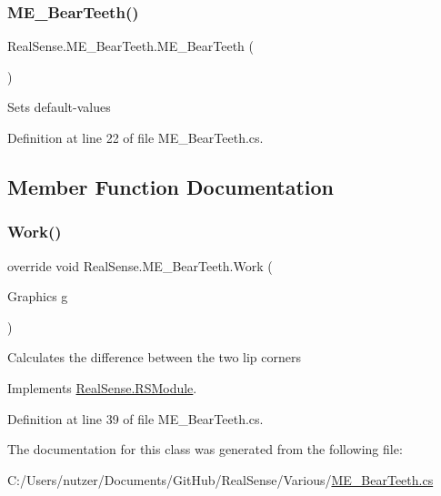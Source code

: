 \subsubsection{\texorpdfstring{M\+E\+\_\+\+Bear\+Teeth()}{ME\_BearTeeth()}}
{\footnotesize\ttfamily Real\+Sense.\+M\+E\+\_\+\+Bear\+Teeth.\+M\+E\+\_\+\+Bear\+Teeth (\begin{DoxyParamCaption}{ }\end{DoxyParamCaption})}

Sets default-\/values 

Definition at line 22 of file M\+E\+\_\+\+Bear\+Teeth.\+cs.



\subsection{Member Function Documentation}
\mbox{\label{class_real_sense_1_1_m_e___bear_teeth_a2e4cc340fec3499318fa7514ee7f1822}} 
\subsubsection{\texorpdfstring{Work()}{Work()}}
{\footnotesize\ttfamily override void Real\+Sense.\+M\+E\+\_\+\+Bear\+Teeth.\+Work (\begin{DoxyParamCaption}\item[{Graphics}]{g }\end{DoxyParamCaption})\hspace{0.3cm}{\ttfamily [virtual]}}

Calculates the difference between the two lip corners 

Implements \hyperlink{class_real_sense_1_1_r_s_module_a2ec830b7932ee7c0077d473f81c73867}{Real\+Sense.\+R\+S\+Module}.



Definition at line 39 of file M\+E\+\_\+\+Bear\+Teeth.\+cs.



The documentation for this class was generated from the following file\+:\begin{DoxyCompactItemize}
\item 
C\+:/\+Users/nutzer/\+Documents/\+Git\+Hub/\+Real\+Sense/\+Various/\hyperlink{_m_e___bear_teeth_8cs}{M\+E\+\_\+\+Bear\+Teeth.\+cs}\end{DoxyCompactItemize}
